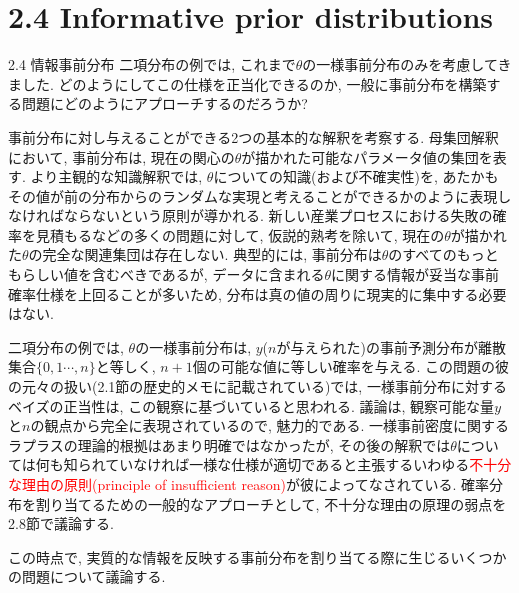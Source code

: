 \documentclass[10pt,dvipdfmx,a4]{beamer}
\newcommand{\tcr}[1]{\textcolor{red}{#1}}
\begin{document}
\section{2.4 Informative prior distributions}
\begin{frame}{2.4 情報事前分布}
二項分布の例では, これまで$\theta$の一様事前分布のみを考慮してきました.
どのようにしてこの仕様を正当化できるのか, 一般に事前分布を構築する問題にどのようにアプローチするのだろうか?

事前分布に対し与えることができる2つの基本的な解釈を考察する.
母集団解釈において, 事前分布は, 現在の関心の$\theta$が描かれた可能なパラメータ値の集団を表す.
より主観的な知識解釈では, $\theta$についての知識(および不確実性)を, あたかもその値が前の分布からのランダムな実現と考えることができるかのように表現しなければならないという原則が導かれる.
新しい産業プロセスにおける失敗の確率を見積もるなどの多くの問題に対して, 仮説的熟考を除いて, 現在の$\theta$が描かれた$\theta$の完全な関連集団は存在しない.
典型的には, 事前分布は$\theta$のすべてのもっともらしい値を含むべきであるが, データに含まれる$\theta$に関する情報が妥当な事前確率仕様を上回ることが多いため, 分布は真の値の周りに現実的に集中する必要はない.
\end{frame}


\begin{frame}
二項分布の例では, $\theta$の一様事前分布は, $y$($n$が与えられた)の事前予測分布が離散集合$\{0,1\cdots,n\}$と等しく, $n+1$個の可能な値に等しい確率を与える.
この問題の彼の元々の扱い(2.1節の歴史的メモに記載されている)では, 一様事前分布に対するベイズの正当性は, この観察に基づいていると思われる.
議論は, 観察可能な量$y$と$n$の観点から完全に表現されているので, 魅力的である.
一様事前密度に関するラプラスの理論的根拠はあまり明確ではなかったが, その後の解釈では$\theta$については何も知られていなければ一様な仕様が適切であると主張するいわゆる\tcr{不十分な理由の原則(principle of insufficient reason)}が彼によってなされている.
確率分布を割り当てるための一般的なアプローチとして, 不十分な理由の原理の弱点を2.8節で議論する.

この時点で, 実質的な情報を反映する事前分布を割り当てる際に生じるいくつかの問題について議論する.
\end{frame}

\end{document}
